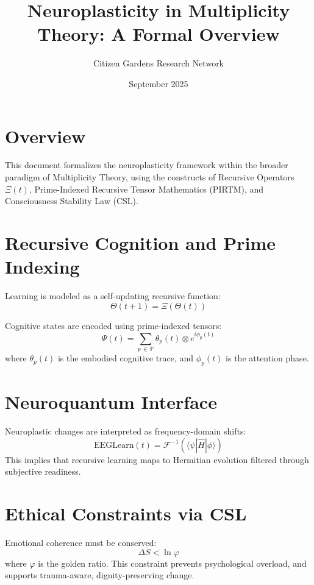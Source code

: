 \documentclass[12pt]{article}
\title{Neuroplasticity in Multiplicity Theory: A Formal Overview}
\author{Citizen Gardens Research Network}
\date{September 2025}
\begin{document}
\maketitle

\section*{Overview}
This document formalizes the neuroplasticity framework within the broader paradigm of Multiplicity Theory, using the constructs of Recursive Operators $\Xi(t)$, Prime-Indexed Recursive Tensor Mathematics (PIRTM), and Consciousness Stability Law (CSL).

\section{Recursive Cognition and Prime Indexing}
Learning is modeled as a self-updating recursive function:
\begin{equation}
\Theta(t+1) = \Xi(\Theta(t))
\end{equation}

Cognitive states are encoded using prime-indexed tensors:
\begin{equation}
\Psi(t) = \sum_{p\,\in\,\mathbb{P}} \theta_p(t) \otimes e^{i\phi_p(t)}
\end{equation}
where $\theta_p(t)$ is the embodied cognitive trace, and $\phi_p(t)$ is the attention phase.

\section{Neuroquantum Interface}
Neuroplastic changes are interpreted as frequency-domain shifts:
\begin{equation}
\text{EEGLearn}(t) = \mathcal{F}^{-1}(\langle \psi | \hat{H} | \phi \rangle)
\end{equation}
This implies that recursive learning maps to Hermitian evolution filtered through subjective readiness.

\section{Ethical Constraints via CSL}
Emotional coherence must be conserved:
\begin{equation}
\Delta S < \ln \varphi
\end{equation}
where $\varphi$ is the golden ratio. This constraint prevents psychological overload, and supports trauma-aware, dignity-preserving change.
\end{document}

